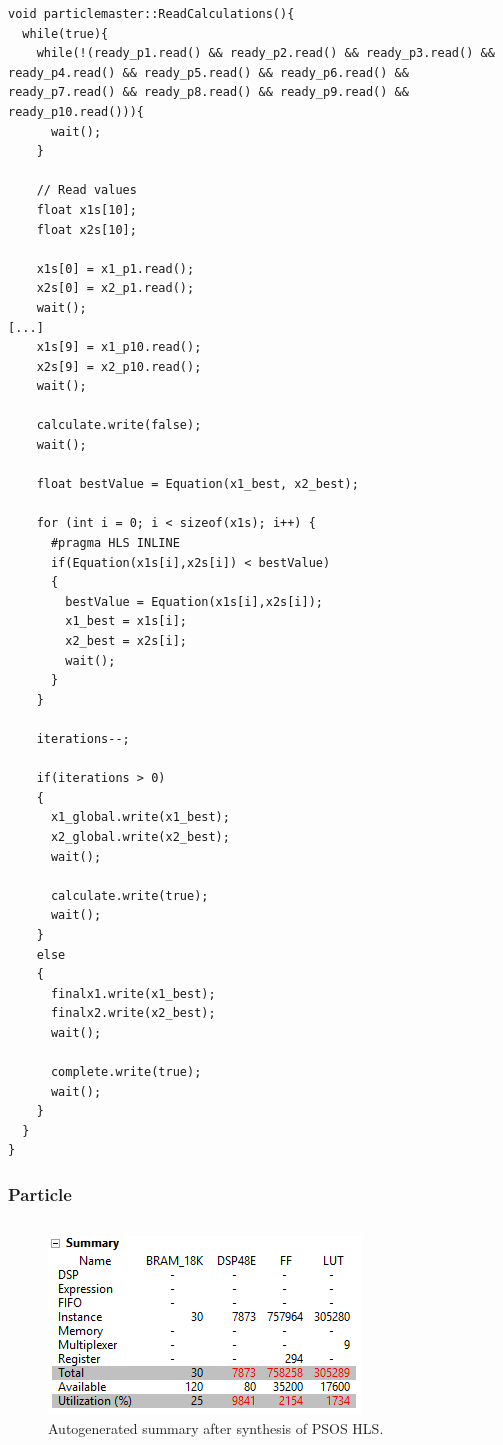\begin{lstlisting}[style=customc++, label={lst:particlemaster_readcalculations}, caption={ReadCalculations thread of ParticleMaster.}]
void particlemaster::ReadCalculations(){
  while(true){
    while(!(ready_p1.read() && ready_p2.read() && ready_p3.read() && ready_p4.read() && ready_p5.read() && ready_p6.read() && ready_p7.read() && ready_p8.read() && ready_p9.read() && ready_p10.read())){
      wait();
    }

    // Read values
    float x1s[10];
    float x2s[10];

    x1s[0] = x1_p1.read();
    x2s[0] = x2_p1.read();
    wait();
[...]
    x1s[9] = x1_p10.read();
    x2s[9] = x2_p10.read();
    wait();

    calculate.write(false);
    wait();

    float bestValue = Equation(x1_best, x2_best);

    for (int i = 0; i < sizeof(x1s); i++) {
      #pragma HLS INLINE
      if(Equation(x1s[i],x2s[i]) < bestValue)
      {
        bestValue = Equation(x1s[i],x2s[i]);
        x1_best = x1s[i];
        x2_best = x2s[i];
        wait();
      }
    }

    iterations--;

    if(iterations > 0)
    {
      x1_global.write(x1_best);
      x2_global.write(x2_best);
      wait();

      calculate.write(true);
      wait();
    }
    else
    {
      finalx1.write(x1_best);
      finalx2.write(x2_best);
      wait();

      complete.write(true);
      wait();
    }
  }
}
\end{lstlisting}

\subsubsection{Particle}



\begin{lstlisting}[style=customc++, label={lst:particle_readcalculations}, caption={ReadCalculations thread of ParticleMaster.}]

\end{lstlisting}



\begin{figure}
	\centering
	\includegraphics[width=0.5\linewidth]{diagram/psos_synthesis_summary}
	\caption{Autogenerated summary after synthesis of PSOS HLS.}
	\label{fig:psossynthesissummary}
\end{figure}


